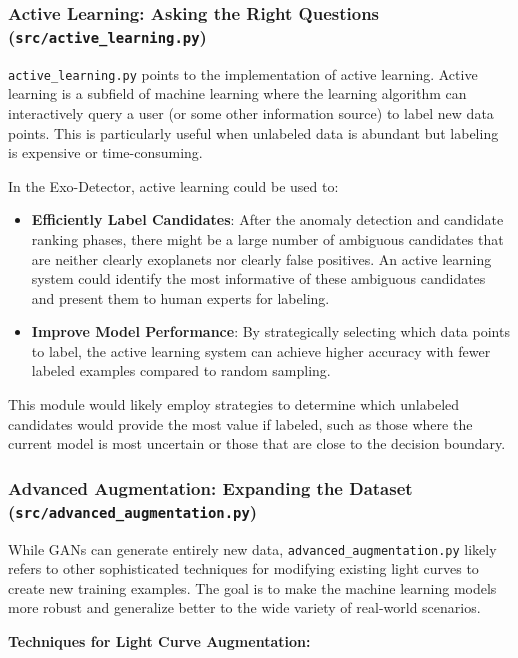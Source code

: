 \documentclass{article}
\begin{document}
\subsubsection{Active Learning: Asking the Right Questions (\texttt{src/active\_learning.py})}

\texttt{active\_learning.py} points to the implementation of active learning. Active learning is a subfield of machine learning where the learning algorithm can interactively query a user (or some other information source) to label new data points. This is particularly useful when unlabeled data is abundant but labeling is expensive or time-consuming.

In the Exo-Detector, active learning could be used to:

\begin{itemize}
    \item \textbf{Efficiently Label Candidates}: After the anomaly detection and candidate ranking phases, there might be a large number of ambiguous candidates that are neither clearly exoplanets nor clearly false positives. An active learning system could identify the most informative of these ambiguous candidates and present them to human experts for labeling.
    \item \textbf{Improve Model Performance}: By strategically selecting which data points to label, the active learning system can achieve higher accuracy with fewer labeled examples compared to random sampling.
\end{itemize}

This module would likely employ strategies to determine which unlabeled candidates would provide the most value if labeled, such as those where the current model is most uncertain or those that are close to the decision boundary.

\subsubsection{Advanced Augmentation: Expanding the Dataset (\texttt{src/advanced\_augmentation.py})}

While GANs can generate entirely new data, \texttt{advanced\_augmentation.py} likely refers to other sophisticated techniques for modifying existing light curves to create new training examples. The goal is to make the machine learning models more robust and generalize better to the wide variety of real-world scenarios.

\textbf{Techniques for Light Curve Augmentation:}
\end{document}

